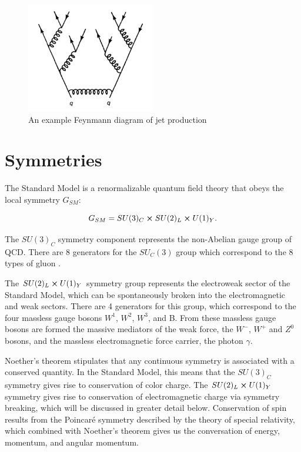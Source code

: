 \begin{figure}
	\includegraphics[width=0.5\textwidth]{figures/ch1/jet_feynmann.png}
	\caption{An example Feynmann diagram of jet production}
	\label{fig:jet_feynmann}
\end{figure}

\section{Symmetries}

The Standard Model is a renormalizable quantum field theory that obeys the local symmetry $G_{SM}$:

\begin{equation}
	G_{SM} = SU(3)_C \cross SU(2)_L \cross U(1)_Y .
\end{equation}

The $SU(3)_C$ symmetry component represents the non-Abelian gauge group of QCD. There are 8 generators for the $SU_C (3)$ group which correspond to the 8 types of gluon \cite{pdg}. \par

The $SU(2)_L \cross U(1)_Y$ symmetry group represents the electroweak sector of the Standard Model, which can be spontaneously broken into the electromagnetic and weak sectors. There are 4 generators for this group, which correspond to the four massless gauge bosons $W^1$, $W^2$, $W^3$, and B. From these massless gauge bosons are formed the massive mediators of the weak force, the $W^-$, $W^+$ and $Z^0$ bosons, and the massless electromagnetic force carrier, the photon $\gamma$. \par

Noether's theorem stipulates that any continuous symmetry is associated with a conserved quantity. In the Standard Model, this means that the $SU(3)_C$ symmetry gives rise to conservation of color charge. The $SU(2)_L \cross U(1)_Y$ symmetry gives rise to conservation of electromagnetic charge via symmetry breaking, which will be discussed in greater detail below. Conservation of spin results from the Poincar\'e symmetry described by the theory of special relativity, which combined with Noether's theorem gives us the conversation of energy, momentum, and angular momentum.\par

